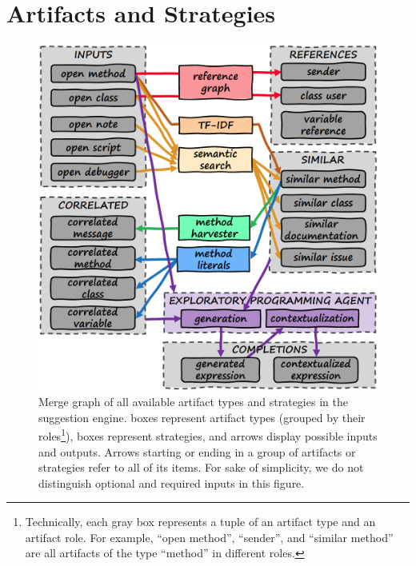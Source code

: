 
\section{Artifacts and Strategies}
\label{sec:suggestions/overview}

\begin{figure}
	\begin{minipage}{\textwidth}
		\centering
		\includegraphics[height=17\baselineskip]{01_overview/graph.png}
		\caption[Merge graph of all available artifact types and strategies in the suggestion engine.]{
			Merge graph of all available artifact types and strategies in the suggestion engine.
			\bold{\textcolor{gray}{Gray}} boxes represent artifact types (grouped by their roles\footnote{
				Technically, each gray box represents a tuple of an artifact type and an artifact role.
				For example, ``open method'', ``sender'', and ``similar method'' are all artifacts of the type ``method'' in different roles.
			}),  boxes represent strategies, and arrows display possible inputs and outputs.
			Arrows starting or ending in a group of artifacts or strategies refer to all of its items.
			For sake of simplicity, we do not distinguish optional and required inputs in this figure.
		}
		\label{fig:suggestions/overview/graph}
	\end{minipage}
\end{figure}

